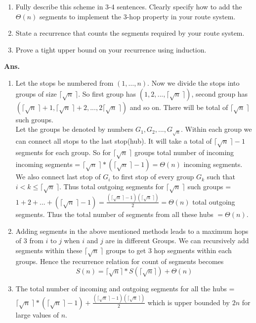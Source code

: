 \documentclass[11pt]{article}
\begin{document}
\begin{enumerate}
\item Fully describe this scheme in 3-4 sentences.  Clearly specify how to add the $\Theta(n)$ segments to implement the 3-hop property in your route system.

\item State a recurrence that counts the segments required by your route system.

\item Prove a tight upper bound on your recurrence using induction.  
\end{enumerate}
\newpage
\noindent \textbf{Ans.}
\begin{enumerate}
    \item Let the stops be numbered from $(1, \ldots, n)$. Now we divide the stops into groups of size $\lceil {\sqrt{n}\ } \rceil$. So first group has $(1,2,...,\lceil {\sqrt{n}\ } \rceil)$, second group has $(\lceil {\sqrt{n}\ } \rceil +1,\lceil {\sqrt{n}\ } \rceil+2,...,2\lceil {\sqrt{n}\ } \rceil)$ and so on. There will be total of $\lceil {\sqrt{n}\ } \rceil$ such groups.\\
    Let the groups be denoted by numbers $G_1,G_2,...,G_{\sqrt{n}}$. Within each group we can connect all stops to the last stop(hub). It will take a total of $\lceil {\sqrt{n}\ } \rceil-1$ segments for each group. So for $\lceil {\sqrt{n}\ } \rceil$ groups total number of incoming incoming segments = $\lceil {\sqrt{n}\ } \rceil*(\lceil {\sqrt{n}\ } \rceil-1) = \Theta(n)$ incoming segments.\\
    We also connect last stop of $G_i$ to first stop of every group $G_k$ such that $i<k\leq\lceil {\sqrt{n}\ } \rceil$. Thus total outgoing segments for $\lceil {\sqrt{n}\ } \rceil$ such groups = $1+2+...+(\lceil {\sqrt{n}\ } \rceil-1) = \frac{(\lceil {\sqrt{n}\ } \rceil-1)(\lceil {\sqrt{n}\ } \rceil)}{2} = \Theta(n)$ total outgoing segments.
    Thus the total number of segments from all these hubs $= \Theta(n)$.
    \item Adding segments in the above mentioned methods leads to a maximum hops of $3$ from $i$ to $j$ when $i$ and $j$ are in different Groups. We can recursively add segments within these $\lceil {\sqrt{n}\ } \rceil$ groups to get $3$ hop segments within each groups. Hence the recurrence relation for count of segments becomes
    $$S(n) = \lceil\sqrt{n}\rceil*S(\lceil\sqrt{n}\rceil)+\Theta(n)$$
    \item The total number of incoming and outgoing segments for all the hubs = $\lceil {\sqrt{n}\ } \rceil*(\lceil {\sqrt{n}\ } \rceil-1) + \frac{(\lceil {\sqrt{n}\ } \rceil-1)(\lceil {\sqrt{n}\ } \rceil)}{2}$ which is upper bounded by $2n$ for large values of $n$.

\end{enumerate}
\end{document}
